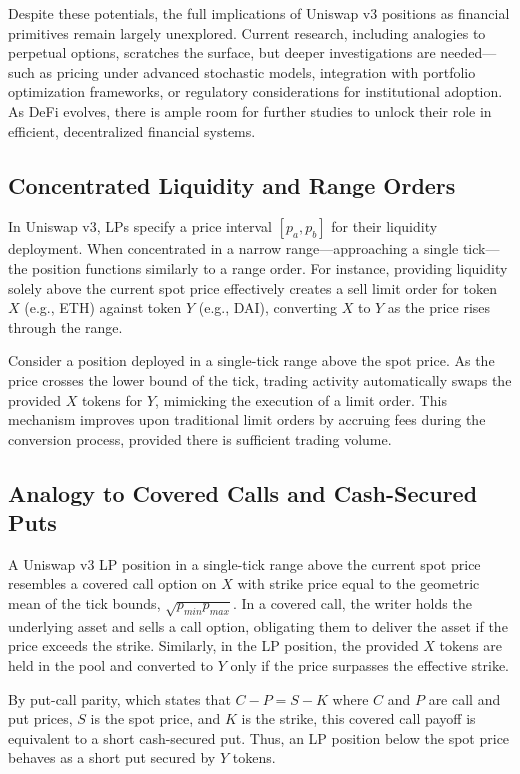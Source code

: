\documentclass{article}
\begin{document}
Despite these potentials, the full implications of Uniswap v3 positions as financial primitives remain largely unexplored. Current research, including analogies to perpetual options, scratches the surface, but deeper investigations are needed—such as pricing under advanced stochastic models, integration with portfolio optimization frameworks, or regulatory considerations for institutional adoption. As DeFi evolves, there is ample room for further studies to unlock their role in efficient, decentralized financial systems.

\subsection{Concentrated Liquidity and Range Orders}

In Uniswap v3, LPs specify a price interval $[p_a, p_b]$ for their liquidity deployment. When concentrated in a narrow range---approaching a single tick---the position functions similarly to a range order. For instance, providing liquidity solely above the current spot price effectively creates a sell limit order for token $X$ (e.g., ETH) against token $Y$ (e.g., DAI), converting $X$ to $Y$ as the price rises through the range.

Consider a position deployed in a single-tick range above the spot price. As the price crosses the lower bound of the tick, trading activity automatically swaps the provided $X$ tokens for $Y$, mimicking the execution of a limit order. This mechanism improves upon traditional limit orders by accruing fees during the conversion process, provided there is sufficient trading volume.

\subsection{Analogy to Covered Calls and Cash-Secured Puts}

A Uniswap v3 LP position in a single-tick range above the current spot price resembles a covered call option on $X$ with strike price equal to the geometric mean of the tick bounds, $\sqrt{p_{min} p_{max}}$. In a covered call, the writer holds the underlying asset and sells a call option, obligating them to deliver the asset if the price exceeds the strike. Similarly, in the LP position, the provided $X$ tokens are held in the pool and converted to $Y$ only if the price surpasses the effective strike.

By put-call parity, which states that $C - P = S - K$ where $C$ and $P$ are call and put prices, $S$ is the spot price, and $K$ is the strike, this covered call payoff is equivalent to a short cash-secured put. Thus, an LP position below the spot price behaves as a short put secured by $Y$ tokens.
\end{document}
